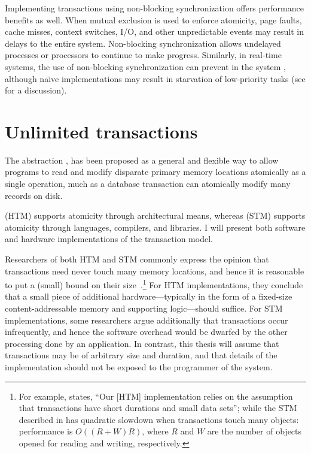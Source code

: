 Implementing transactions using
non-blocking synchronization offers performance benefits as well.
When mutual exclusion is used to enforce atomicity, page
faults, cache misses, context
switches, I/O, and other unpredictable events may result in delays to the
entire system. Non-blocking
synchronization allows undelayed processes or processors to continue
to make progress.
Similarly, in real-time systems, the use of non-blocking
synchronization can prevent 
 in the system
\cite{Jones97}, although na\"{\i}ve implementations may result in
starvation of low-priority tasks (see  for a discussion).

\section{Unlimited transactions}

The
 abstraction
\cite{Knight86,HerlihyMo93,StoneStHe93,RajwarGo02,ShavitTo95,HerlihyLuMoSc03},
has
been proposed as a general and flexible way to allow programs to read
and modify disparate primary memory locations atomically as a single
operation, much as a database transaction can atomically modify many
records on disk.

 (HTM) supports atomicity through
architectural means, whereas 
(STM) supports atomicity through languages, compilers, and libraries.
I will present both software and hardware implementations of the
transaction model.

Researchers of both HTM and STM commonly express the opinion that
transactions need never touch many memory locations, and hence it is
reasonable to put a (small) bound on their
size~\cite{HerlihyMo93,HerlihyLuMoSc03}.\footnote{%
For example, \cite[section 5.2]{HerlihyMo93} states,
``Our [HTM] implementation relies on the assumption that transactions have
short durations and small data sets''; while 
the STM described in \cite{HerlihyLuMoSc03} has quadratic slowdown when
transactions touch many objects: performance is $O((R+W)R)$, where $R$
and $W$ are the number of objects opened for reading and writing,
respectively.}
For HTM implementations,
they conclude that a small piece of additional hardware---typically in
the form of a fixed-size content-addressable memory and supporting
logic---should suffice.  For STM implementations, some researchers
argue additionally that transactions occur infrequently, and hence the
software overhead would be dwarfed by the other processing done by an
application.
In contrast, this thesis will assume that transactions may be of
arbitrary size and duration, and that details of the implementation
should not be exposed to the programmer of the system.

